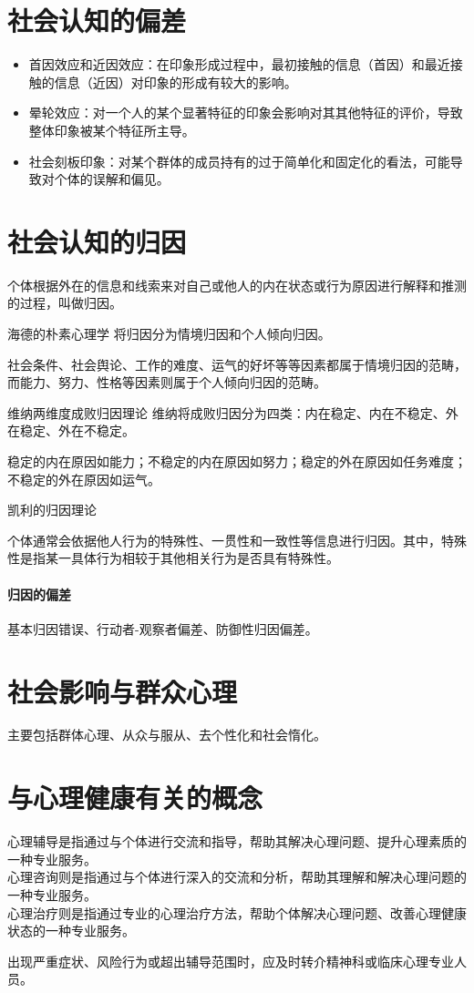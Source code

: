 \documentclass[b5paper,11pt]{article}
\begin{document}
\section{社会认知的偏差}
\begin{itemize}
  \item \textcolor{ctp-peach}{首因效应和近因效应}：在印象形成过程中，最初接触的信息（首因）和最近接触的信息（近因）对印象的形成有较大的影响。
  \item \textcolor{ctp-peach}{晕轮效应}：对一个人的某个显著特征的印象会影响对其其他特征的评价，导致整体印象被某个特征所主导。
  \item \textcolor{ctp-peach}{社会刻板印象}：对某个群体的成员持有的过于简单化和固定化的看法，可能导致对个体的误解和偏见。
\end{itemize}

\section{社会认知的归因}
个体根据外在的信息和线索来对自己或他人的内在状态或行为原因进行解释和推测的过程，叫做归因。

\textcolor{ctp-peach}{海德的朴素心理学} 将归因分为情境归因和个人倾向归因。
\begin{cquote}
  社会条件、社会舆论、工作的难度、运气的好坏等等因素都属于情境归因的范畴，而能力、努力、性格等因素则属于个人倾向归因的范畴。
\end{cquote}

\textcolor{ctp-peach}{维纳两维度成败归因理论} 维纳将成败归因分为四类：内在稳定、内在不稳定、外在稳定、外在不稳定。
\begin{cquote}
  稳定的内在原因如能力；不稳定的内在原因如努力；稳定的外在原因如任务难度；不稳定的外在原因如运气。
\end{cquote}

\textcolor{ctp-peach}{凯利的归因理论}
\begin{cquote}
  个体通常会依据他人行为的特殊性、一贯性和一致性等信息进行归因。其中，特殊性是指某一具体行为相较于其他相关行为是否具有特殊性。
\end{cquote}

\paragraph{归因的偏差} 基本归因错误、行动者-观察者偏差、防御性归因偏差。

\section{社会影响与群众心理}
主要包括群体心理、从众与服从、去个性化和社会惰化。

\section{与心理健康有关的概念}
\begin{cquote}
  心理辅导是指通过与个体进行交流和指导，帮助其解决心理问题、提升心理素质的一种专业服务。 \\
  心理咨询则是指通过与个体进行深入的交流和分析，帮助其理解和解决心理问题的一种专业服务。\\
  心理治疗则是指通过专业的心理治疗方法，帮助个体解决心理问题、改善心理健康状态的一种专业服务。
\end{cquote}

\textcolor{ctp-red}{出现严重症状、风险行为或超出辅导范围时，应及时转介精神科或临床心理专业人员。}
\end{document}
